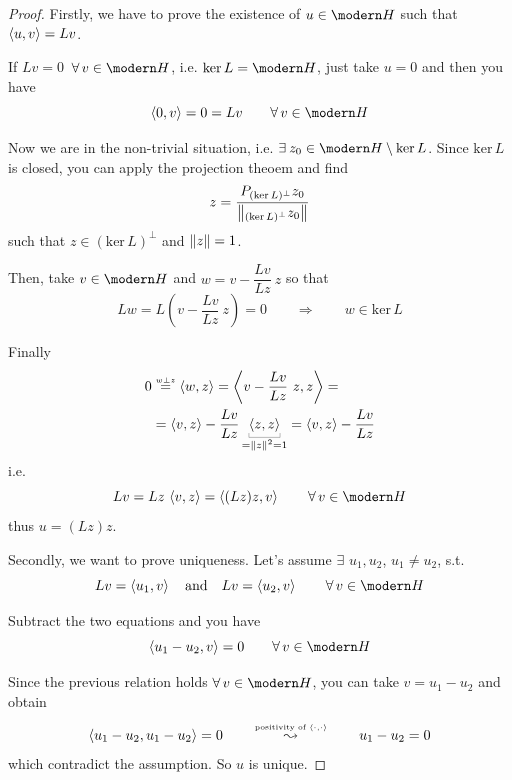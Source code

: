 \begin{proof}
Firstly, we have to prove the existence of $u\in\Hc$ such that $\left\langle u,v \right\rangle=Lv$.

If $Lv=0$ $\,\forall v\in\Hc$, i.e. $\text{ker}\,L=\Hc$, just take $u=0$ and then you have
\begin{equation*}
\sca{0,v}=0=Lv\qquad \forall v\in \Hc
\end{equation*}

Now we are in the non-trivial situation, i.e. $\exists z_0\in \Hc\setminus\text{ker}\,L$. Since $\text{ker}\,L$ is closed, you can apply the projection theoem and find
\begin{equation*}
z=\frac{P_{(\text{ker}\,L)^\perp}z_0}{\left\lVert _{(\text{ker}\,L)^\perp}z_0 \right\rVert} 
\end{equation*}
such that $z\in(\text{ker}\,L)^\perp$ and $\left\lVert z \right\rVert=1$.

Then, take $v\in\Hc$ and $w=v-\dfrac{Lv}{Lz}\ z$ so that 
\begin{equation*}
Lw=L\left( v-\frac{Lv}{Lz}\ z \right) = 0\qquad\Longrightarrow\qquad  w\in\text{ker}\,L
\end{equation*}

Finally
\begin{align*}
0&\overset{\underset{w\perp z}{}}{=}\sca{w,z} = \sca{v-\frac{Lv}{Lz}\ z,z}= \\
&=\sca{v,z}-\frac{Lv}{Lz}\underbracket[0.2pt]{\sca{z,z}}_{=\norm{z}^2=1}=\sca{v,z}-\frac{Lv}{Lz}
\end{align*}
i.e. 
\begin{equation*}
Lv=Lz\,\sca{v,z}=\sca{(Lz)z,v}\qquad\forall v\in\Hc
\end{equation*}
thus $u=(Lz)z$.

Secondly, we want to prove uniqueness. Let's assume $\exists$ $u_1,u_2$, $u_1\neq u_2$, s.t.
\begin{equation*}
Lv=\sca{u_1,v}\quad\text{and}\quad Lv=\sca{u_2,v}\qquad\forall v\in\Hc
\end{equation*}

Subtract the two equations and you have
\begin{equation*}
\sca{u_1-u_2,v}=0\qquad \forall v\in\Hc
\end{equation*}

Since the previous relation holds $\forall v\in\Hc$, you can take $v=u_1-u_2$ and obtain
\begin{equation*}
\left\langle u_1-u_2,u_1-u_2 \right\rangle=0\qquad\overset{\underset{\text{positivity of }\left\langle \cdot,\cdot \right\rangle}{}}{\leadsto}
\qquad u_1-u_2=0
\end{equation*}
which contradict the assumption. So $u$ is unique.


\end{proof}

